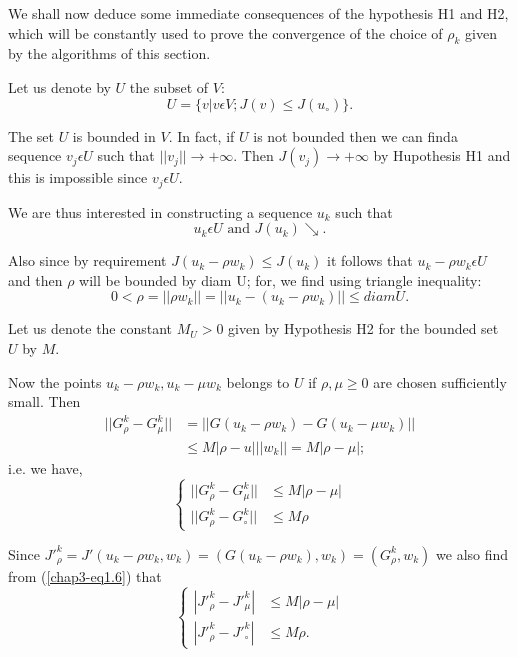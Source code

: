 We shall now deduce some immediate consequences of the hypothesis H1 and H2, which will be constantly used to prove the convergence of the choice of $\rho_{k}$ given by the algorithms of this section.

Let us denote by $U$ the subset of $V$:
$$
U = \{v |v \epsilon V ; J(v) \leq J(u_{\circ})\}.
$$

The set $U$ is bounded in $V$. In fact, if $U$ is not bounded then we can find\pageoriginale a sequence $v_{j} \epsilon U$ such that $||v_{j}|| \to + \infty$. Then $J(v_{j}) \to + \infty$ by Hupothesis H1 and this is impossible since $v_{j} \epsilon U$.

We are thus interested in constructing a sequence $u_{k}$ such that
$$
u_{k} \epsilon U \text{ and } J(u_{k})\searrow.
$$

Also since by requirement $J(u_{k} - \rho w_{k}) \leq J(u_{k})$ it follows that $u_{k} - \rho w_{k} \epsilon U$ and then $\rho$ will be bounded by diam U; for, we find using triangle inequality:
$$
0 < \rho = ||\rho w_{k}|| = ||u_{k} - (u_{k} - \rho w_{k})|| \leq diam U.
$$

Let us denote the constant $M_{U} > 0$ given by Hypothesis H2 for the bounded set $U$ by $M$.

Now the points $u_{k} - \rho w_{k}, u_{k} - \mu w_{k}$ belongs to $U$ if $\rho, \mu \geq 0$ are chosen sufficiently small. Then
\begin{align*}
|| G_{\rho}^{k} - G_{\mu}^{k}|| & = ||G(u_{k}-\rho w_{k}) - G(u_{k}-\mu w_{k})||\\
& \leq M |\rho-u| ||w_{k}|| = M|\rho-\mu|;
\end{align*}
i.e. we have,
\begin{equation*}
\begin{cases}
|| G_{\rho}^{k} - G_{\mu}^{k} || & \leq M|\rho-\mu|\\
|| G_{\rho}^{k} - G_{\circ}^{k}|| & \leq M \rho\tag{1.6}\label{chap3-eq1.6}
\end{cases}
\end{equation*}

Since ${J'}_{\rho}^{k} = J'(u_{k}-\rho w_{k}, w_{k}) = (G(u_{k}-\rho w_{k}), w_{k}) = (G_{\rho}^{k}, w_{k})$ we also find from (\ref{chap3-eq1.6}) that
\begin{equation*}
\begin{cases}
|{J'}_{\rho}^{k} - {J'}_{\mu}^{k}| & \leq M |\rho - \mu|\\
|{J'}_{\rho}^{k} - {J'}_{\circ}^{k}| & \leq M \rho.\tag{1.7}\label{chap3-eq1.7}
\end{cases}
\end{equation*}

